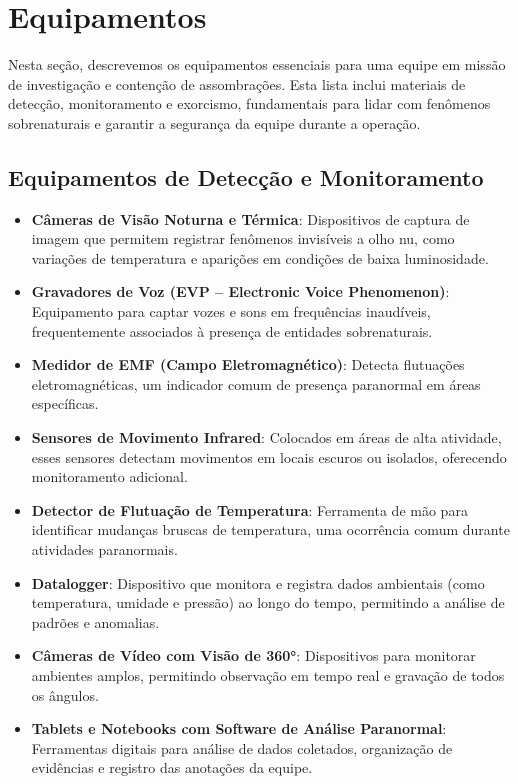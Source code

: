 
\chapter{Equipamentos}

Nesta seção, descrevemos os equipamentos essenciais para uma equipe em missão de investigação e contenção de assombrações. Esta lista inclui materiais de detecção, monitoramento e exorcismo, fundamentais para lidar com fenômenos sobrenaturais e garantir a segurança da equipe durante a operação.

\section{Equipamentos de Detecção e Monitoramento}

\begin{itemize}
    \item \textbf{Câmeras de Visão Noturna e Térmica}: Dispositivos de captura de imagem que permitem registrar fenômenos invisíveis a olho nu, como variações de temperatura e aparições em condições de baixa luminosidade.

    \item \textbf{Gravadores de Voz (EVP – Electronic Voice Phenomenon)}: Equipamento para captar vozes e sons em frequências inaudíveis, frequentemente associados à presença de entidades sobrenaturais.

    \item \textbf{Medidor de EMF (Campo Eletromagnético)}: Detecta flutuações eletromagnéticas, um indicador comum de presença paranormal em áreas específicas.

    \item \textbf{Sensores de Movimento Infrared}: Colocados em áreas de alta atividade, esses sensores detectam movimentos em locais escuros ou isolados, oferecendo monitoramento adicional.

    \item \textbf{Detector de Flutuação de Temperatura}: Ferramenta de mão para identificar mudanças bruscas de temperatura, uma ocorrência comum durante atividades paranormais.

    \item \textbf{Datalogger}: Dispositivo que monitora e registra dados ambientais (como temperatura, umidade e pressão) ao longo do tempo, permitindo a análise de padrões e anomalias.

    \item \textbf{Câmeras de Vídeo com Visão de 360°}: Dispositivos para monitorar ambientes amplos, permitindo observação em tempo real e gravação de todos os ângulos.

    \item \textbf{Tablets e Notebooks com Software de Análise Paranormal}: Ferramentas digitais para análise de dados coletados, organização de evidências e registro das anotações da equipe.
\end{itemize}

